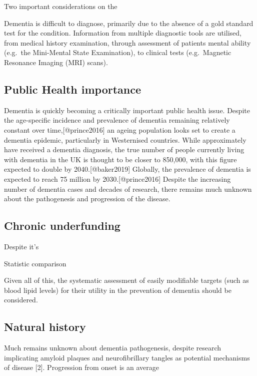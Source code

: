 \documentclass[a4paper,nobind]{templates/ociamthesis}
\begin{document}
Two important considerations on the

Dementia is difficult to diagnose, primarily due to the absence of a gold standard test for the condition. Information from multiple diagnostic tools are utilised, from medical history examination, through assessment of patients mental ability (e.g.~the Mini-Mental State Examination), to clinical tests (e.g.~Magnetic Resonance Imaging (MRI) scans).

\hypertarget{public-health-importance}{%
\subsection{Public Health importance}\label{public-health-importance}}

Dementia is quickly becoming a critically important public health issue. Despite the age-specific incidence and prevalence of dementia remaining relatively constant over time,{[}@prince2016{]} an ageing population looks set to create a dementia epidemic, particularly in Westernised countries. While approximately have received a dementia diagnosis, the true number of people currently living with dementia in the UK is thought to be closer to 850,000, with this figure expected to double by 2040.{[}@baker2019{]} Globally, the prevalence of dementia is expected to reach 75 million by 2030.{[}@prince2016{]} Despite the increasing number of dementia cases and decades of research, there remains much unknown about the pathogenesis and progression of the disease.

\hypertarget{chronic-underfunding}{%
\subsection{Chronic underfunding}\label{chronic-underfunding}}

Despite it's

Statistic comparison

Given all of this, the systematic assessment of easily modifiable targets (such as blood lipid levels) for their utility in the prevention of dementia should be considered.

\hypertarget{natural-history}{%
\subsection{Natural history}\label{natural-history}}

Much remains unknown about dementia pathogenesis, despite research implicating amyloid plaques and neurofibrillary tangles as potential mechanisms of disease {[}2{]}. Progression from onset is an average
\end{document}
